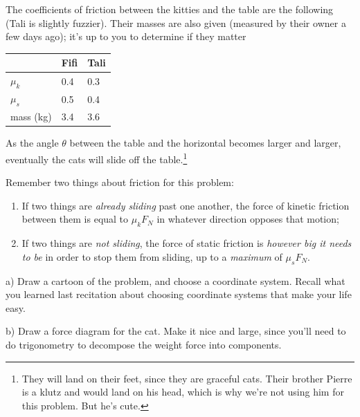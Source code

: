 \documentclass[12pt]{article}
\begin{document}
		\begin{minipage}{0.6\textwidth}
			The coefficients of friction between the kitties and the table are the following (Tali is slightly fuzzier). Their masses are also
			given (measured by their owner a few days ago); it's up to you to determine if they matter
		\end{minipage}\hspace{0.1\textwidth}
		\begin{minipage}{0.3\textwidth}
			\begin{tabular}{|l|l|l|}
				\hline
				& Fifi & Tali \\ \hline
				$\mu_k$ & 0.4  & 0.3  \\ \hline
				$\mu_s$ & 0.5  & 0.4  \\ \hline
				mass (kg) & 3.4 & 3.6 \\ \hline
			\end{tabular}
		\end{minipage}
		
		As the angle $\theta$ between the table and the horizontal becomes larger and larger, eventually the cats will slide off the 
		table.\footnote{They will land on their feet, since they are graceful cats. Their brother Pierre is a klutz and would land on his head, which is why we're not using him for this problem. But he's cute.}
		
		Remember two things about friction for this problem:
		
		\begin{enumerate}
			\item If two things are {\it already sliding} past one another, the force of kinetic friction between them is equal to $\mu_k F_N$ in whatever direction opposes that motion;
			\item If two things are {\it not sliding}, the force of static friction is {\it however big it needs to be} in order to stop
			them from sliding, up to a {\it maximum} of $\mu_s F_N$.
		\end{enumerate}
		
		a) Draw a cartoon of the problem, and choose a coordinate system. Recall what you learned last recitation about choosing
		coordinate systems that make your life easy.
		\vfill
		
		\vspace{2in}
		\newpage
		
		b) Draw a force diagram for the cat. Make it nice and large, since you'll need to do trigonometry to decompose the 
		weight force into components.
		
\end{document}
